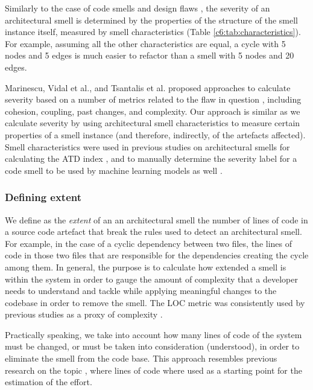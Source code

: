 Similarly to the case of code smells \cite{Arcelli2017b, Arcelli2015b} and design flaws \cite{Marinescu2012}, the severity of an architectural smell is determined by the properties of the structure of the smell instance itself, measured by smell characteristics \cite{Sas2019} (Table \ref*{c6:tab:characteristics}).
For example, assuming all the other characteristics are equal, a cycle with 5 nodes and 5 edges is much easier to refactor than a smell with 5 nodes and 20 edges.

Marinescu, Vidal et al., and Tsantalis et al. proposed approaches to calculate severity based on a number of metrics related to the flaw in question \cite{Marinescu2012, Vidal2016,Tsantalis2011}, including cohesion, coupling, past changes, and complexity.
Our approach is similar as we calculate severity by using architectural smell characteristics \cite{Sas2019} to measure certain properties of a smell instance (and therefore, indirectly, of the artefacts affected).
Smell characteristics were used in previous studies on architectural smells for calculating the ATD index  \cite{Roveda2018}, and to manually determine the severity label for a code smell to be used by machine learning models as well \cite{Arcelli2017b}.

\subsubsection{Defining extent}\label{c6:sec:approach-extent}
We define as the \emph{extent} of an an architectural smell the number of lines of code in a source code artefact that break the rules used to detect an architectural smell.
For example, in the case of a cyclic dependency between two files, the lines of code in those two files that are responsible for the dependencies creating the cycle among them.
In general, the purpose is to calculate how extended a smell is within the system in order to gauge the amount of complexity that a developer needs to understand and tackle while applying meaningful changes to the codebase in order to remove the smell.
The LOC metric was consistently used by previous studies as a proxy of complexity \cite{Morasca2001, Kitchenham2004, Morozoff2010}.%

Practically speaking, we take into account how many lines of code of the system must be changed, or must be taken into consideration (understood), in order to eliminate the smell from the code base.
This approach resembles previous research on the topic \cite{Nugroho2011}, where lines of code where used as a starting point for the estimation of the effort.

